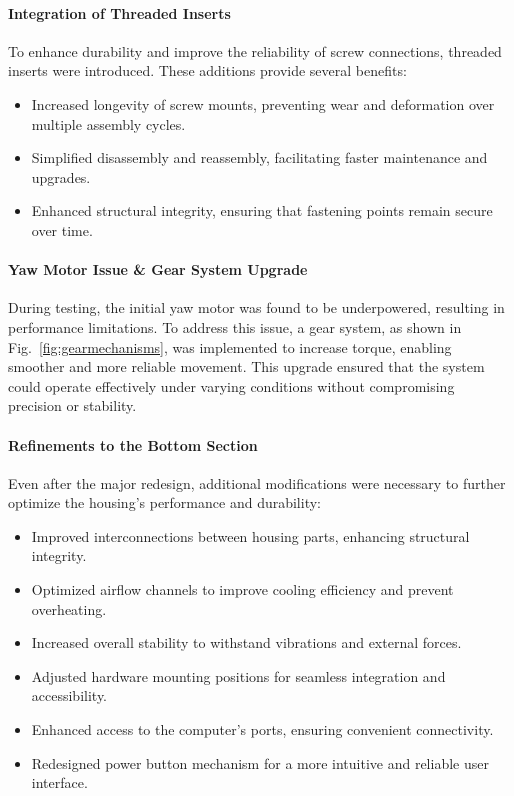 \paragraph{Integration of Threaded Inserts}  
To enhance durability and improve the reliability of screw connections, threaded inserts were introduced. These additions provide several benefits:  
\begin{itemize}  
	\item Increased longevity of screw mounts, preventing wear and deformation over multiple assembly cycles.  
	\item Simplified disassembly and reassembly, facilitating faster maintenance and upgrades.  
	\item Enhanced structural integrity, ensuring that fastening points remain secure over time.  
\end{itemize}  

\paragraph{Yaw Motor Issue \& Gear System Upgrade}  
During testing, the initial yaw motor was found to be underpowered, resulting in performance limitations. To address this issue, a gear system, as shown in Fig.~\ref{fig:gearmechanisms}, was implemented to increase torque, enabling smoother and more reliable movement. This upgrade ensured that the system could operate effectively under varying conditions without compromising precision or stability.  

\paragraph{Refinements to the Bottom Section}  
Even after the major redesign, additional modifications were necessary to further optimize the housing’s performance and durability:  
\begin{itemize}  
	\item Improved interconnections between housing parts, enhancing structural integrity.  
	\item Optimized airflow channels to improve cooling efficiency and prevent overheating.  
	\item Increased overall stability to withstand vibrations and external forces.  
	\item Adjusted hardware mounting positions for seamless integration and accessibility.  
	\item Enhanced access to the computer’s ports, ensuring convenient connectivity.  
	\item Redesigned power button mechanism for a more intuitive and reliable user interface.  
\end{itemize}  

